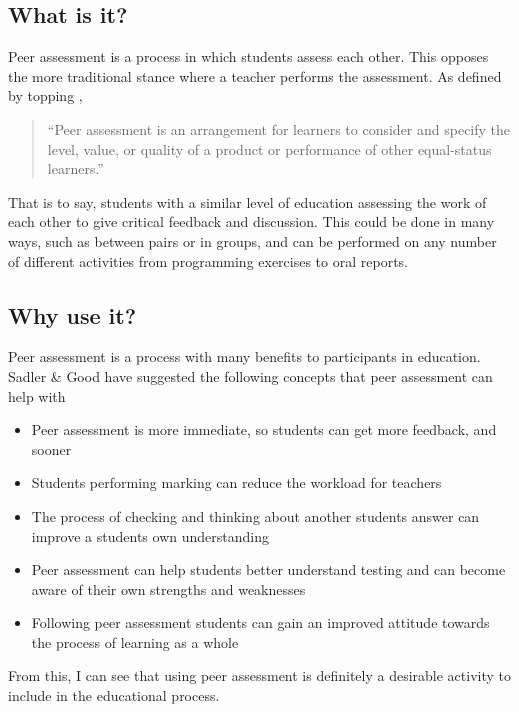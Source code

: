 \documentclass[a4paper,11pt]{report}
\begin{document}
\subsection{What is it?}
Peer assessment is a process in which students assess each other. This opposes the more traditional stance where a teacher performs the assessment. As defined by topping \cite{topping_peer_2009},
\begin{quote}
``Peer assessment is an arrangement for learners to consider and specify the level, value, or quality of a product or performance of other equal-status learners.''
\end{quote}
That is to say, students with a similar level of education assessing the work of each other to give critical feedback and discussion. This could be done in many ways, such as between pairs or in groups, and can be performed on any number of different activities from programming exercises to oral reports.\par


\subsection{Why use it?}
Peer assessment is a process with many benefits to participants in education. Sadler \& Good \cite{sadler_impact_2006} have suggested the following concepts that peer assessment can help with
\begin{itemize}
 \item Peer assessment is more immediate, so students can get more feedback, and sooner
 \item Students performing marking can reduce the workload for teachers
 \item The process of checking and thinking about another students answer can improve a students own understanding \label{sec:peer-test-why}
 \item Peer assessment can help students better understand testing and can become aware of their own strengths and weaknesses
 \item Following peer assessment students can gain an improved attitude towards the process of learning as a whole
\end{itemize}
From this, I can see that using peer assessment is definitely a desirable activity to include in the educational process.\par
\end{document}
